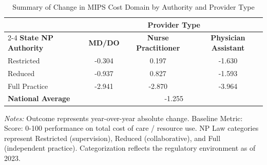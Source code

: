 \begin{table}[htbp]
    \centering
    \caption{Summary of Change in MIPS Cost Domain by Authority and Provider Type}
    \label{tab:d_mips_cost_score_provtype}
    \vspace{0.2cm}
    \begin{tabular}{lccc}
        \toprule
        & \multicolumn{3}{c}{\textbf{Provider Type}} \\
        \cmidrule(lr){2-4}
        \textbf{State NP Authority} & \textbf{MD/DO} & \textbf{Nurse Practitioner} & \textbf{Physician Assistant} \\
        \midrule
        Restricted & -0.304 & 0.197 & -1.630 \\
        Reduced & -0.937 & 0.827 & -1.593 \\
        Full Practice & -2.941 & -2.870 & -3.964 \\
        \midrule
        \textbf{National Average} & \multicolumn{3}{c}{-1.255} \\
        \bottomrule
    \end{tabular}
    \vspace{0.1cm}
    \begin{minipage}{0.85\textwidth}
        \footnotesize \textit{Notes:} Outcome represents year-over-year absolute change. Baseline Metric: Score: 0-100 performance on total cost of care / resource use. NP Law categories represent Restricted (supervision), Reduced (collaborative), and Full (independent practice). Categorization reflects the regulatory environment as of 2023.
    \end{minipage}
\end{table}